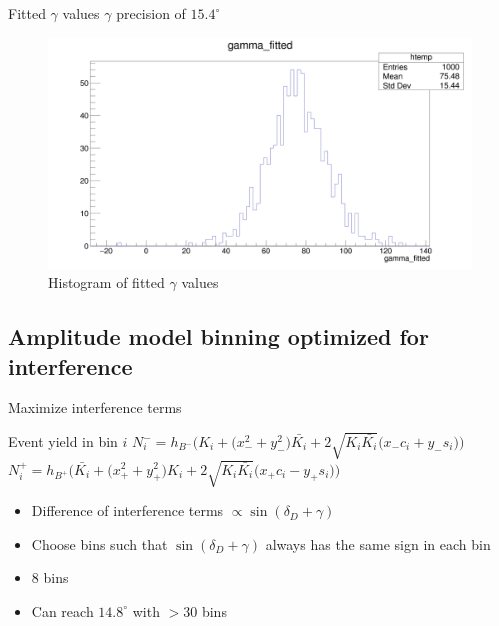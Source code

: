 \documentclass{beamer}
\begin{document}
\begin{frame}{Fitted $\gamma$ values}
  $\gamma$ precision of $15.4^\circ$
  \begin{figure}
    \centering
    \includegraphics[width = 1.0\textwidth]{AmplitudePulls/gammafitted1K1K.png}
    \caption{Histogram of fitted $\gamma$ values}
  \end{figure}
\end{frame}

\subsection{Amplitude model binning optimized for interference}
\begin{frame}{Maximize interference terms}
  \begin{block}{Event yield in bin $i$}
    $N^-_i = h_{B^-}\Big(K_i + \big(x_-^2 + y_-^2\big)\bar{K_i} + 2\sqrt{K_i\bar{K_i}}\big(x_-c_i + y_-s_i\big)\Big)$
    $N^+_i = h_{B^+}\Big(\bar{K_i} + \big(x_+^2 + y_+^2\big)K_i + 2\sqrt{K_i\bar{K_i}}\big(x_+c_i - y_+s_i\big)\Big)$
  \end{block}
  \begin{itemize}
    \item{Difference of interference terms $\propto\sin(\delta_D + \gamma)$}
    \item{Choose bins such that $\sin(\delta_D + \gamma)$ always has the same sign in each bin}
    \item{$8$ bins}
    \item{Can reach $14.8^\circ$ with $>30$ bins}
  \end{itemize}
\end{frame}
\end{document}
